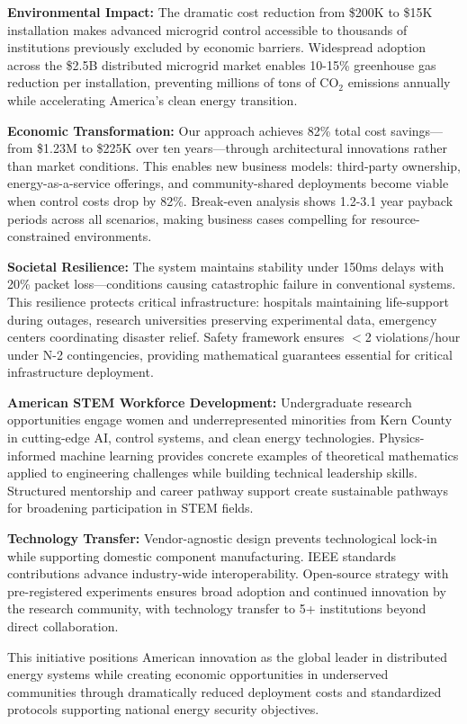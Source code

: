 \documentclass[12pt]{article}
\begin{document}
\textbf{Environmental Impact:} The dramatic cost reduction from \$200K to \$15K installation makes advanced microgrid control accessible to thousands of institutions previously excluded by economic barriers. Widespread adoption across the \$2.5B distributed microgrid market enables 10-15\% greenhouse gas reduction per installation, preventing millions of tons of CO$_2$ emissions annually while accelerating America's clean energy transition.

\textbf{Economic Transformation:} Our approach achieves 82\% total cost savings—from \$1.23M to \$225K over ten years—through architectural innovations rather than market conditions. This enables new business models: third-party ownership, energy-as-a-service offerings, and community-shared deployments become viable when control costs drop by 82\%. Break-even analysis shows 1.2-3.1 year payback periods across all scenarios, making business cases compelling for resource-constrained environments.

\textbf{Societal Resilience:} The system maintains stability under 150ms delays with 20\% packet loss—conditions causing catastrophic failure in conventional systems. This resilience protects critical infrastructure: hospitals maintaining life-support during outages, research universities preserving experimental data, emergency centers coordinating disaster relief. Safety framework ensures $<$2 violations/hour under N-2 contingencies, providing mathematical guarantees essential for critical infrastructure deployment.

\textbf{American STEM Workforce Development:} Undergraduate research opportunities engage women and underrepresented minorities from Kern County in cutting-edge AI, control systems, and clean energy technologies. Physics-informed machine learning provides concrete examples of theoretical mathematics applied to engineering challenges while building technical leadership skills. Structured mentorship and career pathway support create sustainable pathways for broadening participation in STEM fields.

\textbf{Technology Transfer:} Vendor-agnostic design prevents technological lock-in while supporting domestic component manufacturing. IEEE standards contributions advance industry-wide interoperability. Open-source strategy with pre-registered experiments ensures broad adoption and continued innovation by the research community, with technology transfer to 5+ institutions beyond direct collaboration.

This initiative positions American innovation as the global leader in distributed energy systems while creating economic opportunities in underserved communities through dramatically reduced deployment costs and standardized protocols supporting national energy security objectives.
\end{document}
